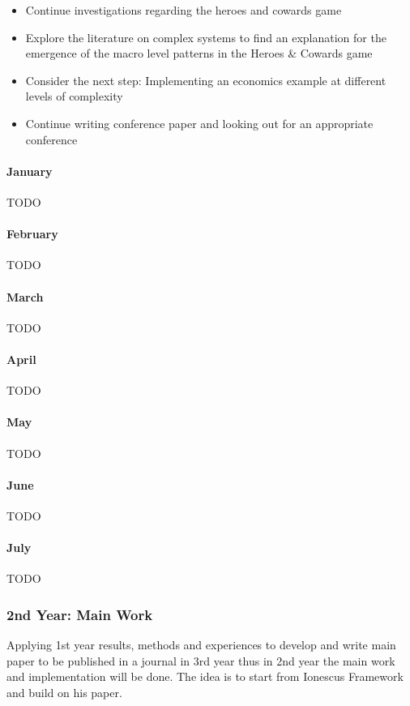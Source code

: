 \begin{itemize}
\item Continue investigations regarding the heroes and cowards game
\item Explore the literature on complex systems to find an explanation for the emergence of the macro level patterns in the Heroes \& Cowards game
\item Consider the next step: Implementing an economics example at different levels of complexity 
\item Continue writing conference paper and looking out for an appropriate conference
\end{itemize}

\paragraph{January}
TODO

\paragraph{February}
TODO

\paragraph{March}
TODO

\paragraph{April}
TODO

\paragraph{May}
TODO

\paragraph{June}
TODO

\paragraph{July}
TODO


\subsubsection{2nd Year: Main Work}
Applying 1st year results, methods and experiences to develop and write main paper to be published in a journal in 3rd year thus in 2nd year the main  work and implementation will be done. The idea is to start from Ionescus Framework \cite{Botta20114025} and build on his paper.

